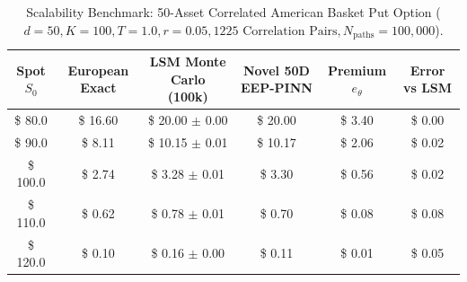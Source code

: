 \begin{table}[h!]
\centering
\small
\caption{Scalability Benchmark: 50-Asset Correlated American Basket Put Option ($d=50, K=100, T=1.0, r=0.05, 1225\text{ Correlation Pairs}, N_{\text{paths}}=100,000$).}
\label{tab:scalability_50d_benchmarks}
\begin{tabular}{@{}cccccc@{}}
\toprule
\textbf{Spot $S_0$} & \textbf{European Exact} & \textbf{LSM Monte Carlo (100k)} & \textbf{Novel 50D EEP-PINN} & \textbf{Premium $e_\theta$} & \textbf{Error vs LSM} \\ \midrule
\$ 80.0 & \$ 16.60 & \$ 20.00 $\pm$ 0.00 & \$ 20.00 & \$ 3.40 & \$ 0.00 \\
\$ 90.0 & \$ 8.11 & \$ 10.15 $\pm$ 0.01 & \$ 10.17 & \$ 2.06 & \$ 0.02 \\
\$ 100.0 & \$ 2.74 & \$ 3.28 $\pm$ 0.01 & \$ 3.30 & \$ 0.56 & \$ 0.02 \\
\$ 110.0 & \$ 0.62 & \$ 0.78 $\pm$ 0.01 & \$ 0.70 & \$ 0.08 & \$ 0.08 \\
\$ 120.0 & \$ 0.10 & \$ 0.16 $\pm$ 0.00 & \$ 0.11 & \$ 0.01 & \$ 0.05 \\
\bottomrule
\end{tabular}
\end{table}
